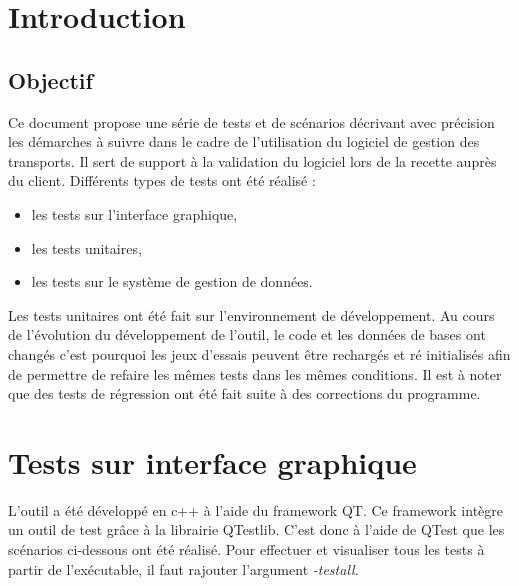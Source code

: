 \documentclass[11pt,fleqn]{report}
\begin{document}
    
\ZMakeCover


\ZMakeTableOfContents

\chapter{Introduction}
\section{Objectif}
Ce document propose une série de tests et de scénarios décrivant avec précision les démarches à suivre dans le cadre de l’utilisation du logiciel de gestion des transports. Il sert de support à la validation du logiciel lors de la recette auprès du client.
Différents types de tests ont été réalisé : 
\begin{itemize}
\item les tests sur l'interface graphique,
\item les tests unitaires,
\item les tests sur le système de gestion de données.
\end{itemize}
Les tests unitaires ont été fait sur l’environnement de développement. 
Au cours de l’évolution du développement de l'outil, le code et les données de bases ont changés c'est pourquoi les jeux d’essais peuvent être rechargés  et ré initialisés afin de permettre de refaire les mêmes tests dans les mêmes conditions. 
Il est à noter que des tests de régression ont été fait suite à des corrections du programme.

\chapter{Tests sur interface graphique}
L'outil a été développé en c++ à l'aide du framework QT. Ce framework intègre un outil de test grâce à la librairie QTestlib.
C'est donc à l'aide de QTest que les scénarios ci-dessous ont été réalisé.
Pour effectuer et visualiser tous les tests à partir de l'exécutable, il faut rajouter l'argument \emph{-testall}.
\end{document}
